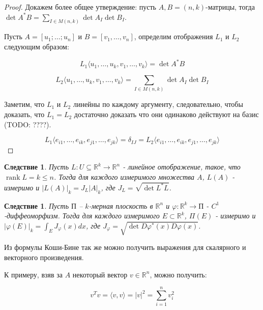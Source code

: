 \documentclass[a5paper]{article}
\newcounter{through}
\theoremstyle{plain}
\newtheorem{corollary}[through]{Следствие}
\theoremstyle{definition}
\numberwithin{through}{section}
\numberwithin{equation}{section}
\DeclareMathOperator{\rank}{rank}
\begin{document}
\begin{proof}
	Докажем более общее утверждение: пусть $A, B = (n, k)$-матрицы, тогда $\det A^* B = \sum\limits_{I \in M(n, k)} \det A_I \det B_I$.
	
	Пусть $A = [u_1; \ldots; u_n]$ и $B = [v_1, \ldots, v_n]$, определим отображения $L_1$ и $L_2$ следующим образом:
	
	\begin{equation*}
		L_1 \langle u_1, \ldots, u_k, v_1, \ldots, v_k \rangle = \det A^* B 
	\end{equation*}
	
	\begin{equation*}
		L_2 \langle u_1, \ldots, u_k, v_1, \ldots, v_k \rangle = \sum\limits_{I \in M(n, k)} \det A_I \det B_I
	\end{equation*}
	
	Заметим, что $L_1$ и $L_2$ линейны по каждому аргументу, следовательно, чтобы доказать, что $L_1=L_2$ достаточно доказать что они одинаково действуют на базис (TODO: ????).
	
	\begin{equation*}
	L_1 \langle e_{i1}, \ldots, e_{ik}, e_{j1}, \ldots, e_{jk} \rangle = \delta_{IJ} = L_2 \langle e_{i1}, \ldots, e_{ik}, e_{j1}, \ldots, e_{jk} \rangle
	\end{equation*}
\end{proof}

\begin{corollary}
	Пусть $L : U \subseteq \mathbb{R}^k \to \mathbb{R}^n$ - линейное отображение, такое, что $\rank L = k \leq n$. Тогда для каждого измеримого множества $A$, $L(A)$ - измеримо и $| L(A) |_k = J_L |A|_k$, где $J_L = \sqrt{\det L^* L}$.
\end{corollary}

\begin{corollary}
	Пусть $\text{П}$ -- $k$-мерная плоскость в $\mathbb{R}^n$ и $\varphi : \mathbb{R}^k \to \text{П}$ - $C^1$-диффеоморфизм. Тогда для каждого измеримого $E \subset \mathbb{R}^k$, $\varPi(E)$ - измеримо и $|\varphi(E)|_k=\int_{E}^{} J_{\varphi}(x)dx$, где $J_{\varphi} = \sqrt{\det D \varphi^* (x) D \varphi(x)}$.
\end{corollary}

Из формулы Коши-Бине так же можно получить выражения для скалярного и векторного произведения. 

К примеру, взяв за $A$ некоторый вектор $v \in \mathbb{R}^n$, можно получить:

\begin{equation*}
	v^T v = \langle v, v \rangle = |v|^2=\sum\limits_{i=1}^n v_i^2
\end{equation*}
\end{document}
